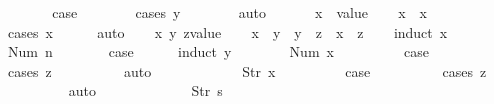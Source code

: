\begin{isabellebody}
\ \ \ \ \isamarkupfalse%
\ \isamarkupfalse%
\ {\isacharquery}case\isanewline
\ \ \ \ \ \ \isamarkupfalse%
\ {\isacharparenleft}cases\ y{\isacharparenright}\isanewline
\ \ \ \ \ \ \isamarkupfalse%
\ auto\isanewline
\ \ \isamarkupfalse%
\isanewline
\ \ \isamarkupfalse%
\ x\ {\isacharcolon}{\isacharcolon}\ {\isachardoublequoteopen}value{\isachardoublequoteclose}\isanewline
\ \ \isamarkupfalse%
\ {\isachardoublequoteopen}x\ {\isasymle}\ x{\isachardoublequoteclose}\isanewline
\ \ \ \ \isamarkupfalse%
\ {\isacharparenleft}cases\ x{\isacharparenright}\isanewline
\ \ \ \ \isamarkupfalse%
\ auto\isanewline
\ \ \isamarkupfalse%
\ x\ y\ z{\isacharcolon}{\isacharcolon}{\isachardoublequoteopen}value{\isachardoublequoteclose}\isanewline
\ \ \isamarkupfalse%
\ {\isachardoublequoteopen}x\ {\isasymle}\ y\ {\isasymLongrightarrow}\ y\ {\isasymle}\ z\ {\isasymLongrightarrow}\ x\ {\isasymle}\ z{\isachardoublequoteclose}\isanewline
\ \ \isamarkupfalse%
\ {\isacharparenleft}induct\ x{\isacharparenright}\isanewline
\ \ \ \ \isamarkupfalse%
\ {\isacharparenleft}Num\ n{\isacharparenright}\isanewline
\ \ \ \ \isamarkupfalse%
\ \isamarkupfalse%
\ {\isacharquery}case\isanewline
\ \ \ \ \isamarkupfalse%
\ {\isacharparenleft}induct\ y{\isacharparenright}\isanewline
\ \ \ \ \ \ \isamarkupfalse%
\ {\isacharparenleft}Num\ x{\isacharparenright}\isanewline
\ \ \ \ \ \ \isamarkupfalse%
\ \isamarkupfalse%
\ {\isacharquery}case\isanewline
\ \ \ \ \ \ \ \ \isamarkupfalse%
\ {\isacharparenleft}cases\ z{\isacharparenright}\isanewline
\ \ \ \ \ \ \ \ \isamarkupfalse%
\ auto\isanewline
\ \ \ \ \isamarkupfalse%
\isanewline
\ \ \ \ \ \ \isamarkupfalse%
\ {\isacharparenleft}Str\ x{\isacharparenright}\isanewline
\ \ \ \ \ \ \isamarkupfalse%
\ \isamarkupfalse%
\ {\isacharquery}case\isanewline
\ \ \ \ \ \ \ \ \isamarkupfalse%
\ {\isacharparenleft}cases\ z{\isacharparenright}\isanewline
\ \ \ \ \ \ \ \ \isamarkupfalse%
\ auto\isanewline
\ \ \ \ \isamarkupfalse%
\isanewline
\ \ \isamarkupfalse%
\isanewline
\ \ \ \ \isamarkupfalse%
\ {\isacharparenleft}Str\ s{\isacharparenright}\isanewline
\ \ \ \ \isamarkupfalse%

\end{isabellebody}
